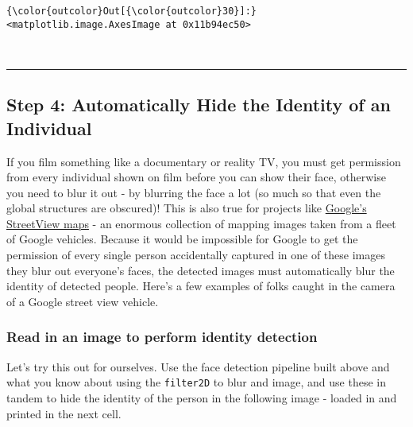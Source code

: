 \documentclass[11pt]{article}
\begin{document}
\begin{Verbatim}[commandchars=\\\{\}]
{\color{outcolor}Out[{\color{outcolor}30}]:} <matplotlib.image.AxesImage at 0x11b94ec50>
\end{Verbatim}
            
    \begin{center}
    \end{center}
    { \hspace*{\fill} \\}
    
    \begin{center}\rule{0.5\linewidth}{\linethickness}\end{center}

\subsection{Step 4: Automatically Hide the Identity of an
Individual}\label{step-4-automatically-hide-the-identity-of-an-individual}

If you film something like a documentary or reality TV, you must get
permission from every individual shown on film before you can show their
face, otherwise you need to blur it out - by blurring the face a lot (so
much so that even the global structures are obscured)! This is also true
for projects like \href{https://www.google.com/streetview/}{Google's
StreetView maps} - an enormous collection of mapping images taken from a
fleet of Google vehicles. Because it would be impossible for Google to
get the permission of every single person accidentally captured in one
of these images they blur out everyone's faces, the detected images must
automatically blur the identity of detected people. Here's a few
examples of folks caught in the camera of a Google street view vehicle.

 

    \subsubsection{Read in an image to perform identity
detection}\label{read-in-an-image-to-perform-identity-detection}

Let's try this out for ourselves. Use the face detection pipeline built
above and what you know about using the \texttt{filter2D} to blur and
image, and use these in tandem to hide the identity of the person in the
following image - loaded in and printed in the next cell.
\end{document}
